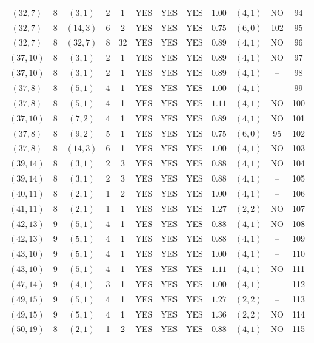 \begin{longtable}{|c|c|c|c|c|c|c|c|c|c|c|c|}
$(32,7)$ & 8 & $(3,1)$ & 2 & 1 & YES & YES & YES & $1.00$ & $(4,1)$ & NO & 94\\
$(32,7)$ & 8 & $(14,3)$ & 6 & 2 & YES & YES & YES & $0.75$ & $(6,0)$ & 102 & 95\\
$(32,7)$ & 8 & $(32,7)$ & 8 & 32 & YES & YES & YES & $0.89$ & $(4,1)$ & NO & 96\\
$(37,10)$ & 8 & $(3,1)$ & 2 & 1 & YES & YES & YES & $0.89$ & $(4,1)$ & NO & 97\\
$(37,10)$ & 8 & $(3,1)$ & 2 & 1 & YES & YES & YES & $0.89$ & $(4,1)$ & -- & 98\\
$(37,8)$ & 8 & $(5,1)$ & 4 & 1 & YES & YES & YES & $1.00$ & $(4,1)$ & -- & 99\\
$(37,8)$ & 8 & $(5,1)$ & 4 & 1 & YES & YES & YES & $1.11$ & $(4,1)$ & NO & 100\\
$(37,10)$ & 8 & $(7,2)$ & 4 & 1 & YES & YES & YES & $0.89$ & $(4,1)$ & NO & 101\\
$(37,8)$ & 8 & $(9,2)$ & 5 & 1 & YES & YES & YES & $0.75$ & $(6,0)$ & 95 & 102\\
$(37,8)$ & 8 & $(14,3)$ & 6 & 1 & YES & YES & YES & $1.00$ & $(4,1)$ & NO & 103\\
$(39,14)$ & 8 & $(3,1)$ & 2 & 3 & YES & YES & YES & $0.88$ & $(4,1)$ & NO & 104\\
$(39,14)$ & 8 & $(3,1)$ & 2 & 3 & YES & YES & YES & $0.88$ & $(4,1)$ & -- & 105\\
$(40,11)$ & 8 & $(2,1)$ & 1 & 2 & YES & YES & YES & $1.00$ & $(4,1)$ & -- & 106\\
$(41,11)$ & 8 & $(2,1)$ & 1 & 1 & YES & YES & YES & $1.27$ & $(2,2)$ & NO & 107\\
$(42,13)$ & 9 & $(5,1)$ & 4 & 1 & YES & YES & YES & $0.88$ & $(4,1)$ & NO & 108\\
$(42,13)$ & 9 & $(5,1)$ & 4 & 1 & YES & YES & YES & $0.88$ & $(4,1)$ & -- & 109\\
$(43,10)$ & 9 & $(5,1)$ & 4 & 1 & YES & YES & YES & $1.00$ & $(4,1)$ & -- & 110\\
$(43,10)$ & 9 & $(5,1)$ & 4 & 1 & YES & YES & YES & $1.11$ & $(4,1)$ & NO & 111\\
$(47,14)$ & 9 & $(4,1)$ & 3 & 1 & YES & YES & YES & $1.00$ & $(4,1)$ & -- & 112\\
$(49,15)$ & 9 & $(5,1)$ & 4 & 1 & YES & YES & YES & $1.27$ & $(2,2)$ & -- & 113\\
$(49,15)$ & 9 & $(5,1)$ & 4 & 1 & YES & YES & YES & $1.36$ & $(2,2)$ & NO & 114\\
$(50,19)$ & 8 & $(2,1)$ & 1 & 2 & YES & YES & YES & $0.88$ & $(4,1)$ & NO & 115\\

\end{longtable}
